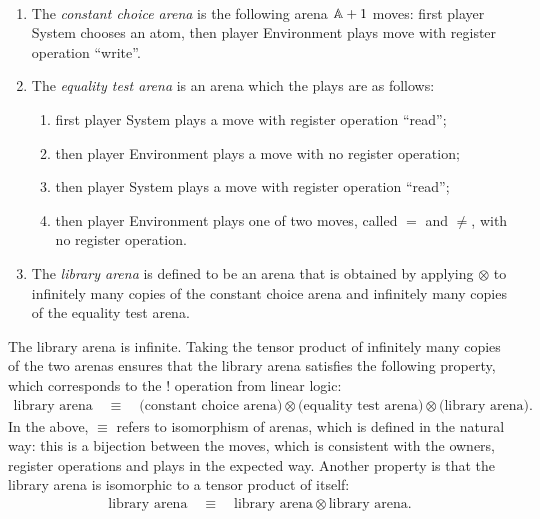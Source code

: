 \begin{definition}\ 
    \begin{enumerate}
        \item The \emph{constant choice arena} is the following arena $\mathbb A+1$ moves: first player System chooses an atom, then player Environment plays move with register operation ``write''.
        \item The \emph{equality test arena} is an arena which the plays are as follows:
    \begin{enumerate}
        \item first player System plays a move with register operation ``read'';
        \item then player Environment plays a move with no register operation;
        \item then player System plays a move with register operation ``read'';
        \item then player Environment plays one of two moves, called $=$ and $\neq$, with no register operation.
    \end{enumerate}
    \item The \emph{library arena} is defined to be an arena that is obtained by applying $\otimes$ to infinitely many copies of the constant choice arena and infinitely many copies of the  equality test arena.
    \end{enumerate}
\end{definition}

The library arena is infinite. Taking the tensor product of infinitely many copies of the two arenas ensures that the library arena satisfies the following property, which corresponds to the $!$ operation from linear logic: 
\begin{align}\label{eq:bang-library-arena}
\text{library arena} 
\quad \equiv \quad 
\text{(constant choice arena)} \otimes 
\text{(equality test arena)} \otimes
 \text{(library arena)}.
\end{align}
In the above, $\equiv$ refers to isomorphism of arenas, which is defined in the natural way: this is a bijection between the moves, which is consistent with the owners, register operations and plays in the expected way.  Another property is that the library arena is isomorphic to a tensor product of itself: 
\begin{align}\label{eq:library-arena-isomorphism}
\text{library arena}
\quad \equiv \quad
\text{library arena} \otimes \text{library arena}.
\end{align}


